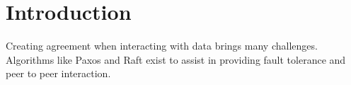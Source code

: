 \section{Introduction}

Creating agreement when interacting with data brings many challenges. Algorithms like Paxos and Raft exist to assist in providing fault tolerance and peer to peer interaction.